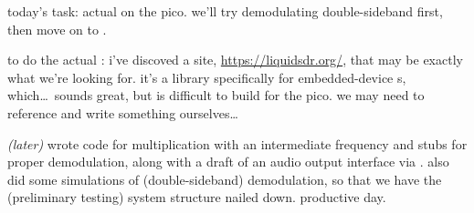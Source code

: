 today's task: actual \dsp on the pico. we'll try demodulating double-sideband
\am first, then move on to \ssb.

to do the actual \dsp: i've discoved a site,
\href{https://liquidsdr.org/}{https://liquidsdr.org/}, that may be exactly what
we're looking for. it's a \dsp library specifically for embedded-device
{\sdr}s, which\dots\ sounds great, but is difficult to build for the pico. we
may need to reference \autocite{discrete-hilbert} and write something
ourselves\dots

\textit{(later)} wrote code for multiplication with an intermediate frequency
and stubs for proper demodulation, along with a draft of an audio output
interface via \dma. also did some simulations of (double-sideband)
demodulation, so that we have the (preliminary testing) system structure nailed
down. productive day.
